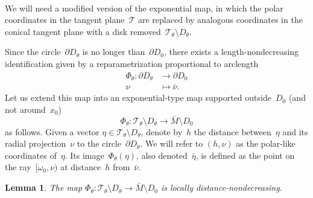 \documentclass[12pt,reqno]{amsart}
\newtheorem{lemma}[theorem]{Lemma}
\theoremstyle{definition}
\numberwithin{equation}{section}
\numberwithin{equation}{section}
\begin{document}
\mbox{ } \medskip

We will need a modified version of the exponential map, in which the polar coordinates in the tangent plane~$\mathcal{T}$ are replaced by analogous coordinates in the conical tangent plane with a disk removed~$\mathcal{T}_\theta \setminus D_\theta$.

\medskip

Since the circle~$\partial D_\theta$ is no longer than~$\partial D_0$, there exists a length-nondecreasing identification given by a reparametrization proportional to arclength
\[
  \begin{aligned}
    \Phi_\theta : \partial D_\theta & \longrightarrow \partial D_0 \\
    \nu & \longmapsto \bar{\nu}.
  \end{aligned}
\]
Let us extend this map into an exponential-type map supported
outside~$D_0$ (and not around~$x_0$)
\[
\Phi_\theta: \mathcal{T}_\theta \setminus D_\theta \to \bar{M} \setminus D_0
\]
as follows.
Given a vector $\eta \in \mathcal{T}_\theta \setminus D_\theta$, denote by~$h$ the distance between~$\eta$ and its radial projection~$\nu$ to the circle~$\partial D_\theta$.
We will refer to $(h,\nu)$ as the polar-like coordinates of~$\eta$.
Its image~$\Phi_\theta(\eta)$, also denoted~$\bar{\eta}$, is defined as the point on the ray~$[\omega_0,\nu)$ at distance~$h$ from~$\bar{\nu}$.

\begin{lemma} \label{lem:noncontracting}
The map $\Phi_\theta: \mathcal{T}_\theta \setminus D_\theta \to \bar{M} \setminus D_0$ is locally distance-nondecreasing.
\end{lemma}
\end{document}
